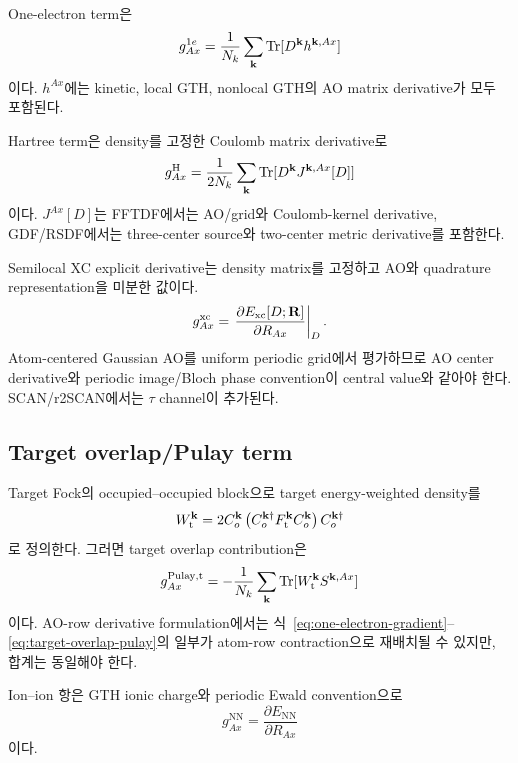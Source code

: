 One-electron term은
\begin{equation}
  g_{Ax}^{1e}
  =\frac{1}{N_k}\sum_{\mathbf{k}}
    \operatorname{Tr}[D^{\mathbf{k}}h^{\mathbf{k},Ax}]
  \label{eq:one-electron-gradient}
\end{equation}
이다. $h^{Ax}$에는 kinetic, local GTH, nonlocal GTH의 AO matrix derivative가 모두
포함된다.

Hartree term은 density를 고정한 Coulomb matrix derivative로
\begin{equation}
  g_{Ax}^{\mathrm H}
  =\frac{1}{2N_k}\sum_{\mathbf{k}}
    \operatorname{Tr}[D^{\mathbf{k}}J^{\mathbf{k},Ax}[D]]
  \label{eq:hartree-gradient}
\end{equation}
이다. $J^{Ax}[D]$는 FFTDF에서는 AO/grid와 Coulomb-kernel derivative, GDF/RSDF에서는
three-center source와 two-center metric derivative를 포함한다.

Semilocal XC explicit derivative는 density matrix를 고정하고 AO와 quadrature representation을
미분한 값이다.
\begin{equation}
  g_{Ax}^{\mathrm{xc}}
  =\left.
    \frac{\partial E_{\mathrm{xc}}[D;\mathbf{R}]}{\partial R_{Ax}}
   \right|_D.
  \label{eq:xc-explicit-gradient}
\end{equation}
Atom-centered Gaussian AO를 uniform periodic grid에서 평가하므로 AO center derivative와
periodic image/Bloch phase convention이 central value와 같아야 한다. SCAN/r2SCAN에서는
$\tau$ channel이 추가된다.

\subsection{Target overlap/Pulay term}

Target Fock의 occupied--occupied block으로 target energy-weighted density를
\begin{equation}
  W_{\mathrm t}^{\mathbf{k}}
  =2C_o^{\mathbf{k}}
    \left(C_o^{\mathbf{k}\dagger}F_{\mathrm t}^{\mathbf{k}}C_o^{\mathbf{k}}\right)
    C_o^{\mathbf{k}\dagger}
  \label{eq:target-energy-weighted-density}
\end{equation}
로 정의한다. 그러면 target overlap contribution은
\begin{equation}
  g_{Ax}^{\mathrm{Pulay,t}}
  =-\frac{1}{N_k}\sum_{\mathbf{k}}
    \operatorname{Tr}[W_{\mathrm t}^{\mathbf{k}}S^{\mathbf{k},Ax}]
  \label{eq:target-overlap-pulay}
\end{equation}
이다. AO-row derivative formulation에서는 식~\eqref{eq:one-electron-gradient}--
\eqref{eq:target-overlap-pulay}의 일부가 atom-row contraction으로 재배치될 수 있지만,
합계는 동일해야 한다.

Ion--ion 항은 GTH ionic charge와 periodic Ewald convention으로
\begin{equation}
  g_{Ax}^{\mathrm{NN}}
  =\frac{\partial E_{\mathrm{NN}}}{\partial R_{Ax}}
  \label{eq:nuclear-repulsion-gradient}
\end{equation}
이다.

